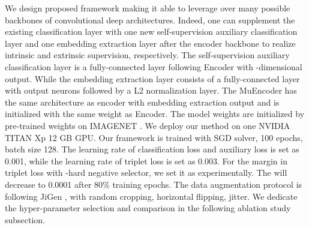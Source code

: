 We design proposed framework making it able to leverage over many possible backbones of convolutional deep architectures.
Indeed, one can supplement the existing classification layer with one new self-supervision auxiliary classification layer and one embedding extraction layer after the encoder backbone to realize intrinsic and extrinsic supervision, respectively.
The self-supervision auxiliary classification layer is a fully-connected layer following Encoder with -dimensional output.
While the embedding extraction layer consists of a fully-connected layer with  output neurons followed by a L2 normalization layer.
The MuEncoder has the same architecture as encoder with embedding extraction output and is initialized with the same weight as Encoder.
The model weights are initialized by pre-trained weights on IMAGENET \cite{deng2009imagenet}.
We deploy our method on one NVIDIA TITAN Xp 12 GB GPU.
Our framework is trained with SGD solver, 100 epochs, batch size 128.
The learning rate  of classification loss and auxiliary loss is set as 0.001, while the learning rate of triplet loss  is set as 0.003.
For the margin in triplet loss with -hard negative selector, we set it as  experimentally.
The  will decrease to 0.0001 after 80\% training epochs.
The data augmentation protocol is following JiGen \cite{carlucci2019domain}, with random cropping, horizontal flipping, jitter.
We dedicate the hyper-parameter selection and comparison in the following ablation study subsection.
\fi 


